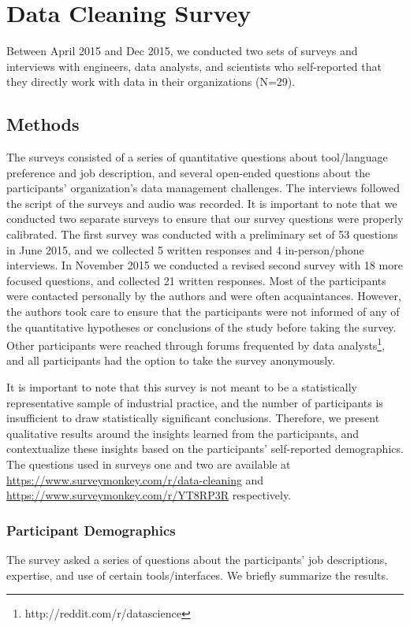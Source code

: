 \section{Data Cleaning Survey}
Between April 2015 and Dec 2015, we conducted two sets of surveys and interviews with engineers, data analysts, and scientists who self-reported that they directly work with data in their organizations (N=29).

\subsection{Methods}\label{sec:survey}
The surveys consisted of a series of quantitative questions about tool/language preference and job description, and several open-ended questions about the participants' organization's data management challenges. The interviews followed the script of the surveys and audio was recorded.
It is important to note that we conducted two separate surveys to ensure that our survey questions were properly calibrated.
The first survey was conducted with a preliminary set of 53 questions in June 2015, and we collected 5 written responses and 4 in-person/phone interviews.
In November 2015 we conducted a revised second survey with 18 more focused questions, and collected 21 written responses. 
Most of the participants were contacted personally by the authors and were often acquaintances.
However, the authors took care to ensure that the participants were not informed of any of the quantitative hypotheses or conclusions of the study before taking the survey. 
Other participants were reached through forums frequented by data analysts\footnote{http://reddit.com/r/datascience}, and all participants had the option to take the survey anonymously.

It is important to note that this survey is not meant to be a statistically representative sample of industrial practice, and the number of participants is insufficient to draw statistically significant conclusions. Therefore, we present qualitative results around the insights learned from the participants, and contextualize these insights based on the participants' self-reported demographics.
The questions used in surveys one and two are available at \url{https://www.surveymonkey.com/r/data-cleaning} and \url{https://www.surveymonkey.com/r/YT8RP3R} respectively.

\subsubsection{Participant Demographics}
The survey asked a series of questions about the participants' job descriptions, expertise, and use of certain tools/interfaces.
We briefly summarize the results.

